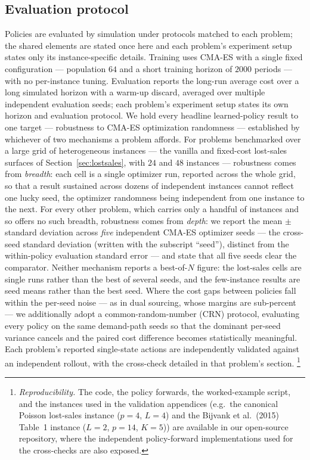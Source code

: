 \documentclass[11pt]{article}
\begin{document}
\subsection{Evaluation protocol}
\label{sec:methods-eval}

Policies are evaluated by simulation under protocols matched to each problem; the shared elements are
stated once here and each problem's experiment setup states only its instance-specific details.
Training uses CMA-ES with a single fixed configuration --- population $64$ and a short training
horizon of $2000$ periods --- with no per-instance tuning. Evaluation reports the long-run average
cost over a long simulated horizon with a warm-up discard, averaged over multiple independent
evaluation seeds; each problem's experiment setup states its own horizon and evaluation protocol.
We hold every headline learned-policy result to one target --- robustness to CMA-ES optimization
randomness --- established by whichever of two mechanisms a problem affords. For problems benchmarked
over a large grid of heterogeneous instances --- the vanilla and fixed-cost lost-sales surfaces of
Section~\ref{sec:lostsales}, with $24$ and $48$ instances --- robustness comes from \emph{breadth}:
each cell is a single optimizer run, reported across the whole grid, so that a result sustained
across dozens of independent instances cannot reflect one lucky seed, the optimizer randomness being
independent from one instance to the next. For every other problem, which carries only a handful of
instances and so offers no such breadth, robustness comes from \emph{depth}: we report the mean $\pm$
standard deviation across \emph{five} independent CMA-ES optimizer seeds --- the cross-seed standard
deviation (written with the subscript ``seed''), distinct from the within-policy evaluation standard
error --- and state that all five seeds clear the comparator. Neither mechanism reports a
best-of-$N$ figure: the lost-sales cells are single runs rather than the best of several seeds, and
the few-instance results are seed means rather than the best seed.
Where the cost gaps between policies fall within the per-seed noise --- as in dual sourcing, whose
margins are sub-percent --- we additionally adopt a common-random-number (CRN) protocol, evaluating
every policy on the same demand-path seeds so that the dominant per-seed variance cancels and the
paired cost difference becomes statistically meaningful. Each problem's reported
single-state actions are independently validated against an independent rollout, with the cross-check detailed
in that problem's section.%
\footnote{\emph{Reproducibility.} The code, the policy forwards, the worked-example script, and the
instances used in the validation appendices (e.g.\ the canonical Poisson lost-sales instance
($p=4$, $L=4$) and the Bijvank et al.\ (2015) Table~1 instance ($L=2$, $p=14$, $K=5$)) are available in
our open-source repository, where the
independent policy-forward implementations used for the cross-checks are also exposed.}
\end{document}
